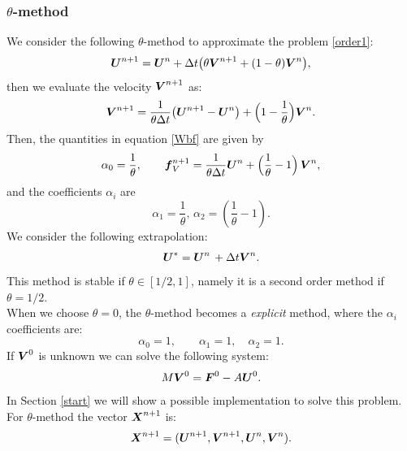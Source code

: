 \documentclass[english,a4paper]{article}
\newcommand{\Xbf}{\text{\mbox{\boldmath $X$}}}
\newcommand{\Ubf}{\text{\mbox{\boldmath $U$}}}
\newcommand{\fbf}{\text{\mbox{\boldmath $f$}}}
\newcommand{\Fbf}{\text{\mbox{\boldmath $F$}}}
\newcommand{\Wbf}{\text{\mbox{\boldmath $V$}}}
\begin{document}
\subsubsection{$\theta$-method}\label{TM}
We consider the following  $\theta$-method to approximate the problem \eqref{order1}:
\begin{equation} \label{vel}
\Ubf^{n+1}=\Ubf^n+ \Delta t\big(\theta \Wbf^{n+1}+ (1-\theta)\Wbf^n\big),
\end{equation}
then we evaluate the velocity $\Wbf^{n+1}$ as:
\begin{equation}\label{theta}
\Wbf^{n+1}=\frac{1}{\theta\Delta t}\big(\Ubf^{n+1}-\Ubf^n\big)+\Big(1-\frac{1}{\theta}\Big)\Wbf^n.
\end{equation}
Then,  the quantities in equation
\eqref{Wbf} are given by
$$\displaystyle\alpha_0=\frac{1}{\theta}, \qquad
\displaystyle \fbf_V^{n+1}=\frac{1}{\theta\Delta t}\Ubf^n+\Big(\frac{1}{\theta}-1\Big)\,\Wbf^n,$$
and the coefficients $\alpha_i$ are
\begin{equation}\label{alphatheta}
\displaystyle\alpha_{1}=\frac{1}{\theta}, \,
\displaystyle\alpha_2=\left(\frac{1}{\theta}-1\right).
\end{equation}
We consider the following extrapolation:
\[
\Ubf^*=\Ubf^{n}\,+ \Delta t \Wbf^n.
\]
This method is stable if  $\theta\in[1/2,1]$, namely  it is a second
order method  if  $\theta=1/2$. \\
When we choose $\theta = 0$, the $\theta$-method becomes a {\sl
  explicit} method, where the $\alpha_i$ coefficients are:
$$
\alpha_0=1, \qquad \alpha_1=1, \quad \alpha_2=1.
$$
If $\Wbf^0$ is unknown we can solve the following system:
$$M\Wbf^0= \Fbf^0-A\Ubf^0.$$
In  Section \ref{start} we will show a possible implementation to solve
this problem.
For  $\theta$-method the vector $\Xbf^{n+1}$ is:
$$\Xbf^{n+1}=(\Ubf^{n+1},\Wbf^{n+1}, \Ubf^n, \Wbf^n). $$
\end{document}
